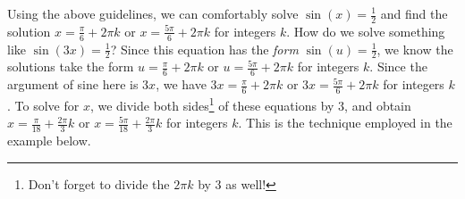 Using the above guidelines, we can comfortably solve $\sin(x) = \frac{1}{2}$ and find the solution $x = \frac{\pi}{6} + 2\pi k$ or $x = \frac{5\pi}{6} + 2\pi k$ for integers $k$. How do we solve something like $\sin(3x) = \frac{1}{2}$?  Since this equation has the \textit{form} $\sin(u) = \frac{1}{2}$, we know the solutions take the form  $u= \frac{\pi}{6} + 2\pi k$ or $u = \frac{5\pi}{6} + 2\pi k$ for integers $k$. Since the argument of sine here is $3x$, we have $3x= \frac{\pi}{6} + 2\pi k$ or $3x = \frac{5\pi}{6} + 2\pi k$ for integers $k$. To solve for $x$, we divide both sides\footnote{Don't forget to divide the $2\pi k$ by $3$ as well!} of these equations by $3$, and obtain $x = \frac{\pi}{18} + \frac{2\pi}{3} k$ or $x = \frac{5\pi}{18} + \frac{2\pi}{3}k$ for integers $k$.  This is the technique employed in the example below.

